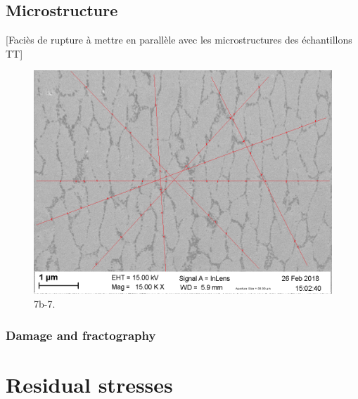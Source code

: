 
\subsection{Microstructure}
[Faciès de rupture à mettre en parallèle avec les microstructures des échantillons TT]

\begin{figure}[ht]
	\centering
	\centerline{\includegraphics[scale=0.005,angle=180]{Images/171024-7b_7}}
	\decoRule
	\caption[]{7b-7.}
	\label{fig:result_rs1}
\end{figure}

\subsubsection{Damage and fractography}

\section{Residual stresses}

